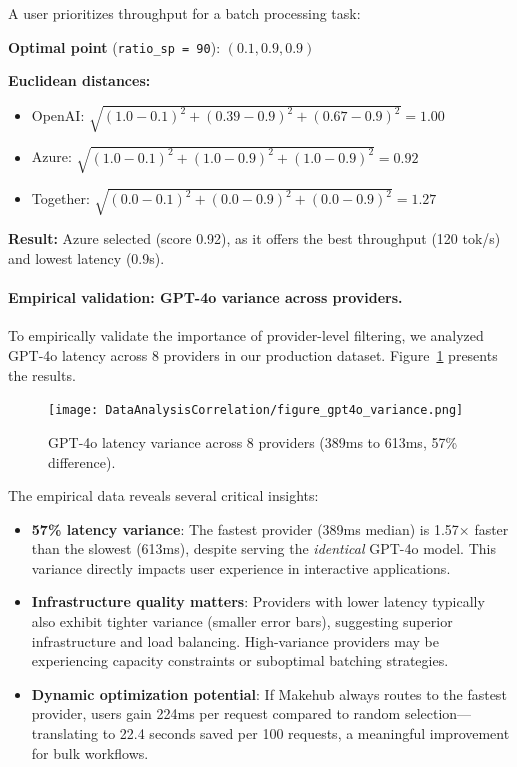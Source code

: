 \documentclass[english]{article}
\begin{document}
A user prioritizes throughput for a batch processing task:

\textbf{Optimal point} (\texttt{ratio\_sp = 90}): $(0.1, 0.9, 0.9)$

\textbf{Euclidean distances:}
\begin{itemize}
    \item OpenAI: $\sqrt{(1.0-0.1)^2 + (0.39-0.9)^2 + (0.67-0.9)^2} = 1.00$
    \item Azure: $\sqrt{(1.0-0.1)^2 + (1.0-0.9)^2 + (1.0-0.9)^2} = 0.92$
    \item Together: $\sqrt{(0.0-0.1)^2 + (0.0-0.9)^2 + (0.0-0.9)^2} = 1.27$
\end{itemize}

\textbf{Result:} Azure selected (score 0.92), as it offers the best throughput (120 tok/s) and lowest latency (0.9s).

\paragraph{Empirical validation: GPT-4o variance across providers.}

To empirically validate the importance of provider-level filtering, we analyzed GPT-4o latency across 8 providers in our production dataset. Figure~\ref{fig:gpt4o_variance} presents the results.

\begin{figure}[H]
\centering
\texttt{[image: DataAnalysisCorrelation/figure\_gpt4o\_variance.png]}
\caption{GPT-4o latency variance across 8 providers (389ms to 613ms, 57\% difference).}
\label{fig:gpt4o_variance}
\end{figure}

The empirical data reveals several critical insights:
\begin{itemize}
    \item \textbf{57\% latency variance}: The fastest provider (389ms median) is 1.57× faster than the slowest (613ms), despite serving the \emph{identical} GPT-4o model. This variance directly impacts user experience in interactive applications.
    \item \textbf{Infrastructure quality matters}: Providers with lower latency typically also exhibit tighter variance (smaller error bars), suggesting superior infrastructure and load balancing. High-variance providers may be experiencing capacity constraints or suboptimal batching strategies.
    \item \textbf{Dynamic optimization potential}: If Makehub always routes to the fastest provider, users gain 224ms per request compared to random selection—translating to 22.4 seconds saved per 100 requests, a meaningful improvement for bulk workflows.
\end{itemize}
\end{document}

